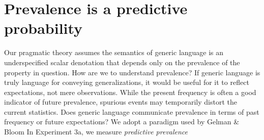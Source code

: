 \documentclass[12pt,letterpaper]{article}
\begin{document}



%

\section*{Prevalence is a predictive probability}

Our pragmatic theory assumes the semantics of generic language is an underspecified scalar denotation that depends only on the prevalence of the property in question.
How are we to understand prevalence?
If generic language is truly language for conveying generalizations, it would be useful for it to reflect expectations, not mere observations.
While the present frequency is often a good indicator of future prevalence, spurious events may temporarily distort the current statistics.
Does generic language communicate prevalence in terms of past frequency or future expectations?
We adopt a paradigm used by Gelman \& Bloom
In Experiment 3a, we measure \emph{predictive prevalence} 
\end{document}
